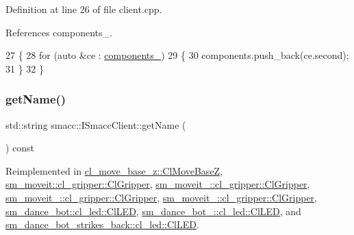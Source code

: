 Definition at line 26 of file client.\+cpp.



References components\+\_\+.


\begin{DoxyCode}
27 \{
28     \textcolor{keywordflow}{for} (\textcolor{keyword}{auto} &ce : \hyperlink{classsmacc_1_1ISmaccClient_a9e670e9071bb549dbeb08985d0114afe}{components\_})
29     \{
30         components.push\_back(ce.second);
31     \}
32 \}
\end{DoxyCode}
\mbox{\label{classsmacc_1_1ISmaccClient_a8c3ce19f182e71909c5dc6263d25be69}} 
\subsubsection{\texorpdfstring{get\+Name()}{getName()}}
{\footnotesize\ttfamily std\+::string smacc\+::\+I\+Smacc\+Client\+::get\+Name (\begin{DoxyParamCaption}{ }\end{DoxyParamCaption}) const\hspace{0.3cm}{\ttfamily [virtual]}}



Reimplemented in \hyperlink{classcl__move__base__z_1_1ClMoveBaseZ_a3c511340ea5df8cbdb833c6c701c47f8}{cl\+\_\+move\+\_\+base\+\_\+z\+::\+Cl\+Move\+BaseZ}, \hyperlink{classsm__moveit_1_1cl__gripper_1_1ClGripper_a71ee172824d9eb24c9a386ea6d8822ea}{sm\+\_\+moveit\+::cl\+\_\+gripper\+::\+Cl\+Gripper}, \hyperlink{classsm__moveit__2_1_1cl__gripper_1_1ClGripper_a080203a4c344166dfebd84c02422a707}{sm\+\_\+moveit\+\_\+::cl\+\_\+gripper\+::\+Cl\+Gripper}, \hyperlink{classsm__moveit__3_1_1cl__gripper_1_1ClGripper_aa3ed6530f95ef8ce74f817f30e70b1b9}{sm\+\_\+moveit\+\_\+::cl\+\_\+gripper\+::\+Cl\+Gripper}, \hyperlink{classsm__moveit__4_1_1cl__gripper_1_1ClGripper_a36193b0a812e86d3bfff8c3d6222d78d}{sm\+\_\+moveit\+\_\+::cl\+\_\+gripper\+::\+Cl\+Gripper}, \hyperlink{classsm__dance__bot_1_1cl__led_1_1ClLED_aa0a9fb92df96fb1bbba35c78fbe4119d}{sm\+\_\+dance\+\_\+bot\+::cl\+\_\+led\+::\+Cl\+L\+ED}, \hyperlink{classsm__dance__bot__2_1_1cl__led_1_1ClLED_a8d0ff178a2228a1b1c32142987f860dc}{sm\+\_\+dance\+\_\+bot\+\_\+::cl\+\_\+led\+::\+Cl\+L\+ED}, and \hyperlink{classsm__dance__bot__strikes__back_1_1cl__led_1_1ClLED_aa774d43fe5a936b4bf292cb5447becd9}{sm\+\_\+dance\+\_\+bot\+\_\+strikes\+\_\+back\+::cl\+\_\+led\+::\+Cl\+L\+ED}.



